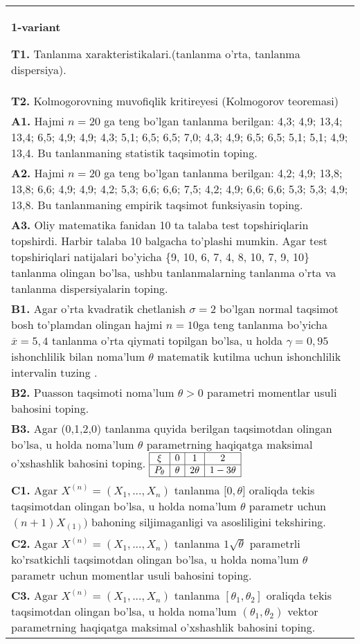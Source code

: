 \documentclass{article}
\begin{document}
\onehalfspacing
{}


\begin{tabular}{m{17cm}}
\textbf{1-variant}
\newline

\textbf{T1.} 
Tanlanma xarakteristikalari.(tanlanma o'rta, tanlanma dispersiya).
\\
\textbf{T2.} 
Kolmogorovning muvofiqlik kritireyesi (Kolmogorov teoremasi)
\\
\textbf{A1.} 
Hajmi \(n = 20\) ga teng bo'lgan tanlanma berilgan: 4,3; 4,9; 13,4; 13,4; 6,5; 4,9; 4,9; 4,3; 5,1; 6,5; 6,5; 7,0; 4,3; 4,9; 6,5; 6,5; 5,1; 5,1; 4,9; 13,4. Bu tanlanmaning statistik taqsimotin toping.
\\
\textbf{A2.} 
Hajmi \(n = 20\) ga teng bo'lgan tanlanma berilgan: 4,2; 4,9; 13,8; 13,8; 6,6; 4,9; 4,9; 4,2; 5,3; 6,6; 6,6; 7,5; 4,2; 4,9; 6,6; 6,6; 5,3; 5,3; 4,9; 13,8. Bu tanlanmaning empirik taqsimot funksiyasin toping.
\\
\textbf{A3.} 
Oliy matematika fanidan 10 ta talaba test topshiriqlarin topshirdi. Harbir talaba 10 balgacha to'plashi mumkin. Agar test topshiriqlari natijalari bo'yicha \{9, 10, 6, 7, 4, 8, 10, 7, 9, 10\} tanlanma olingan bo'lsa, ushbu tanlanmalarning tanlanma o'rta va tanlanma dispersiyalarin toping.
\\
\textbf{B1.} 
Agar o'rta kvadratik chetlanish \(\sigma = 2\) bo'lgan normal taqsimot bosh to'plamdan olingan hajmi \(n = 10\)ga teng tanlanma bo'yicha \(\overline{x} = 5,4\) tanlanma o'rta qiymati topilgan bo'lsa, u holda \(\gamma = 0,95\) ishonchlilik bilan noma'lum \(\theta\) matematik kutilma uchun ishonchlilik intervalin tuzing .
\\
\textbf{B2.} 
Puasson taqsimoti noma'lum \(\theta > 0\) parametri momentlar usuli bahosini toping.
\\
\textbf{B3.} 
Agar (0,1,2,0) tanlanma quyida berilgan taqsimotdan olingan bo'lsa, u holda noma'lum \(\theta\) parametrning haqiqatga maksimal o'xshashlik bahosini toping.
$\begin{array}{|c|c|c|c|}
    \hline
    \xi & 0 & 1 & 2 \\
    \hline
    P_{\theta} & \theta & 2\theta & 1 - 3\theta \\
    \hline
\end{array}$
\\
\textbf{C1.} 
Agar \(X^{(n)} = \left( X_{1},...,X_{n} \right)\) tanlanma \(\lbrack 0,\theta\rbrack\) oraliqda tekis taqsimotdan olingan bo'lsa, u holda noma'lum \(\theta\) parametr uchun \((n + 1)X_{(1)})\) bahoning siljimaganligi va asosliligini tekshiring.
\\
\textbf{C2.} 
Agar \(X^{(n)} = \left( X_{1},...,X_{n} \right)\) tanlanma \(1\sqrt{\theta}\) parametrli ko'rsatkichli taqsimotdan olingan bo'lsa, u holda noma'lum \(\theta\) parametr uchun momentlar usuli bahosini toping.
\\
\textbf{C3.} 
Agar \(X^{(n)} = \left( X_{1},...,X_{n} \right)\) tanlanma \(\left\lbrack \theta_{1},\theta_{2} \right\rbrack\) oraliqda tekis taqsimotdan olingan bo'lsa, u holda noma'lum \(\left( \theta_{1},\theta_{2} \right)\) vektor parametrning haqiqatga maksimal o'xshashlik bahosini toping.
\\


\end{tabular}
\end{document}
